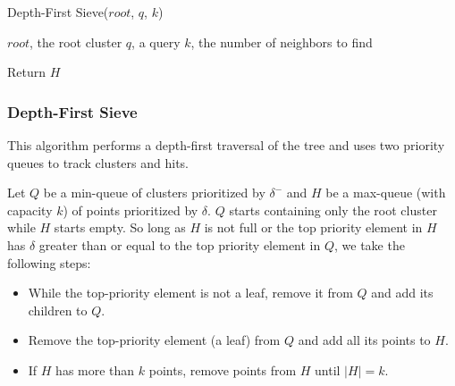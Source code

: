 \begin{minipage}{0.46\textwidth}
\begin{algorithm}[H]
    \caption{Depth-First Sieve($root$, $q$, $k$)}
    \label{alg:methods:depth-first-sieve}
    \begin{tiny}
    \begin{algorithmic}[0]
        \Require $root$, the root cluster
        \Require $q$, a query
        \Require $k$, the number of neighbors to find


            \EndWhile
            \EndFor
            \EndWhile
        \EndWhile
        \State Return $H$
    \end{algorithmic}
    \end{tiny}
\end{algorithm}
\end{minipage}

\subsubsection{Depth-First Sieve}
\label{sec:methods:knn-search:depth-first-sieve}

This algorithm performs a depth-first traversal of the tree and uses two priority queues to track clusters and hits.

Let $Q$ be a min-queue of clusters prioritized by $\delta^{-}$ and $H$ be a max-queue (with capacity $k$) of points prioritized by $\delta$.
$Q$ starts containing only the root cluster while $H$ starts empty.
So long as $H$ is not full or the top priority element in $H$ has $\delta$ greater than or equal to the top priority element in $Q$, we take the following steps:

\begin{itemize}
    \item While the top-priority element is not a leaf, remove it from $Q$ and add its children to $Q$.
    \item Remove the top-priority element (a leaf) from $Q$ and add all its points to $H$.
    \item If $H$ has more than $k$ points, remove points from $H$ until $|H| = k$.
\end{itemize}

